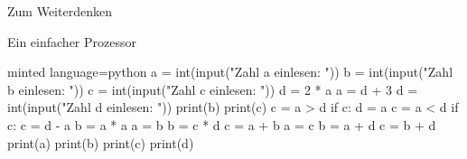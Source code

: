 \begin{task}[points=auto]{Zum Weiterdenken }
\begin{subtask*}[points=0]{Ein einfacher Prozessor}
        \begin{solution}
            \begin{codeBlock}[]{minted language=python}
                a = int(input("Zahl a einlesen: "))
                b = int(input("Zahl b einlesen: "))
                c = int(input("Zahl c einlesen: "))
                d = 2 * a
                a = d + 3
                d = int(input("Zahl d einlesen: "))
                print(b)
                print(c)
                c = a > d
                if c:
                    d = a
                c = a < d
                if c:
                    c = d - a
                b = a * a
                a = b
                b = c * d
                c = a + b
                a = c
                b = a + d
                c = b + d
                print(a)
                print(b)
                print(c)
                print(d)
            \end{codeBlock}
        \end{solution}
    \end{subtask*}
\end{task}

